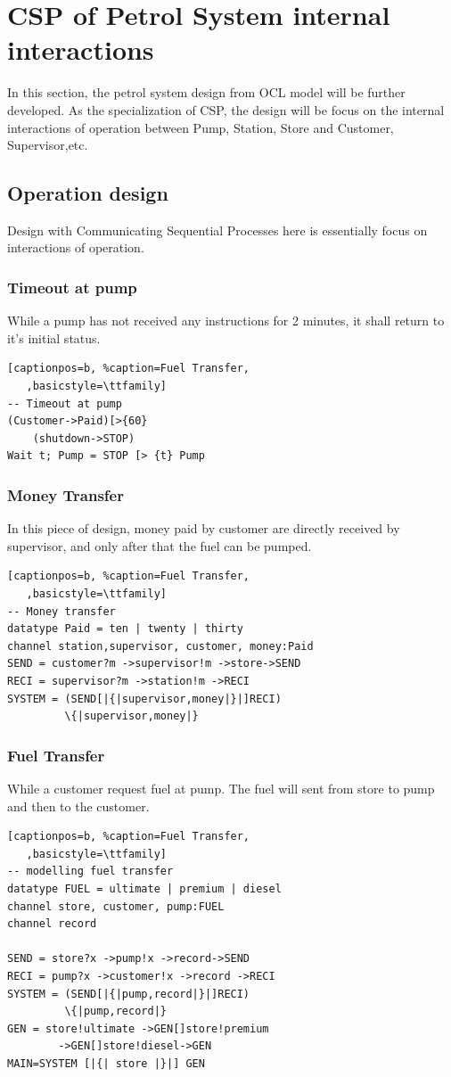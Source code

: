 \section{CSP of Petrol System internal interactions}
In this section, the petrol system design from OCL model will be further developed. As the specialization of CSP, the design will be focus on the internal interactions of operation between Pump, Station, Store and Customer, Supervisor,etc.
\subsection{Operation design}
Design with Communicating Sequential Processes here is essentially focus on interactions of operation. 
\subsubsection{Timeout at pump}
While a pump has not received any instructions for 2 minutes, it shall return to it\char's initial status.
\begin{lstlisting}[captionpos=b, %caption=Fuel Transfer,
   ,basicstyle=\ttfamily]
-- Timeout at pump
(Customer->Paid)[>{60}
    (shutdown->STOP)
Wait t; Pump = STOP [> {t} Pump
\end{lstlisting}
\subsubsection{Money Transfer}
In this piece of design, money paid by customer are directly received by supervisor, and only after that the fuel can be pumped. 
\begin{lstlisting}[captionpos=b, %caption=Fuel Transfer,
   ,basicstyle=\ttfamily]
-- Money transfer
datatype Paid = ten | twenty | thirty
channel station,supervisor, customer, money:Paid
SEND = customer?m ->supervisor!m ->store->SEND
RECI = supervisor?m ->station!m ->RECI
SYSTEM = (SEND[|{|supervisor,money|}|]RECI)
         \{|supervisor,money|}

\end{lstlisting}
\subsubsection{Fuel Transfer}
While a customer request fuel at pump. The fuel will sent from store to pump and then to the customer. 
\begin{lstlisting}[captionpos=b, %caption=Fuel Transfer,
   ,basicstyle=\ttfamily]
-- modelling fuel transfer
datatype FUEL = ultimate | premium | diesel 
channel store, customer, pump:FUEL
channel record

SEND = store?x ->pump!x ->record->SEND
RECI = pump?x ->customer!x ->record ->RECI
SYSTEM = (SEND[|{|pump,record|}|]RECI)
         \{|pump,record|}
GEN = store!ultimate ->GEN[]store!premium 
        ->GEN[]store!diesel->GEN
MAIN=SYSTEM [|{| store |}|] GEN
\end{lstlisting}
